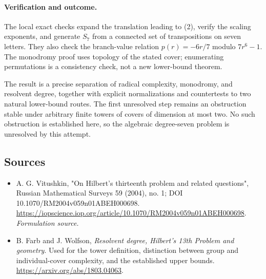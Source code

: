 \documentclass[11pt]{article}
\begin{document}
\paragraph{Verification and outcome.}
The local exact checks expand the translation leading to (2), verify the scaling exponents, and generate $S_7$ from a connected set of transpositions on seven letters. They also check the branch-value relation $p(r)=-6r/7$ modulo $7r^6-1$. The monodromy proof uses topology of the stated cover; enumerating permutations is a consistency check, not a new lower-bound theorem.

The result is a precise separation of radical complexity, monodromy, and resolvent degree, together with explicit normalizations and countertests to two natural lower-bound routes. The first unresolved step remains an obstruction stable under arbitrary finite towers of covers of dimension at most two. No such obstruction is established here, so the algebraic degree-seven problem is unresolved by this attempt.

\subsection{Sources}
\begin{itemize}
\item[S1]A. G. Vitushkin, "On Hilbert's thirteenth problem and related questions", Russian Mathematical Surveys 59 (2004), no. 1; DOI 10.1070/RM2004v059n01ABEH000698.
\url{https://iopscience.iop.org/article/10.1070/RM2004v059n01ABEH000698}.
\textit{Formulation source.}
\item[E1]B. Farb and J. Wolfson, \textit{Resolvent degree, Hilbert's 13th Problem and geometry}. Used for the tower definition, distinction between group and individual-cover complexity, and the established upper bounds.
\url{https://arxiv.org/abs/1803.04063}.

\end{itemize}
\end{document}

